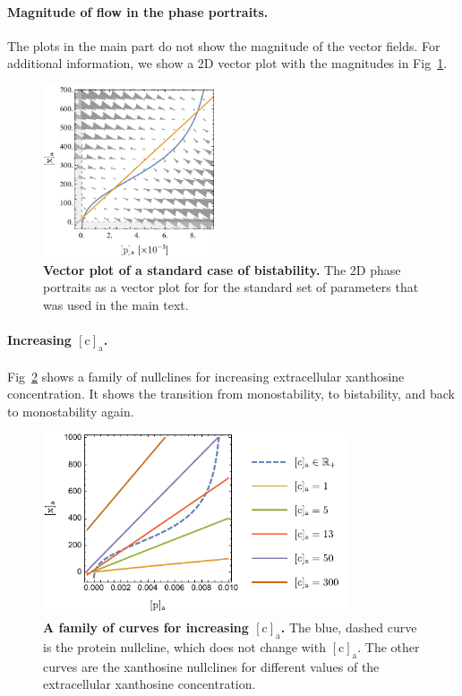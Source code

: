 \documentclass[10pt,letterpaper]{article}
\newcommand{\n}[1]{\mathrm{#1}}
\begin{document}
\paragraph*{Magnitude of flow in the phase portraits.} The plots in the main part do not show the magnitude of the vector fields. For additional information, we show a 2D vector plot with the magnitudes in Fig~\ref{figS4:vector}.

\begin{figure}
	\centering
	\includegraphics[width=0.45\textwidth]{FigSI4.pdf}
	\caption{{\bf Vector plot of a standard case of bistability.}
		The 2D phase portraits as a vector plot for for the standard set of parameters that was used in the main text.}
	\label{figS4:vector} 
\end{figure}

\paragraph*{Increasing $\n{[c]_a}$.}
Fig~\ref{figS5:incC} shows a family of nullclines for increasing extracellular xanthosine concentration. It shows the transition from monostability, to bistability, and back to monostability again.

\begin{figure}
	\centering
	\includegraphics[width=0.8\textwidth]{FigSI5.pdf}
	\caption{{\bf A family of curves for increasing $\n{[c]_a}$.}
		The blue, dashed curve is the protein nullcline, which does not change with $\n{[c]_a}$. The other curves are the xanthosine nullclines for different values of the extracellular xanthosine concentration.}
	\label{figS5:incC}
\end{figure}
\end{document}
